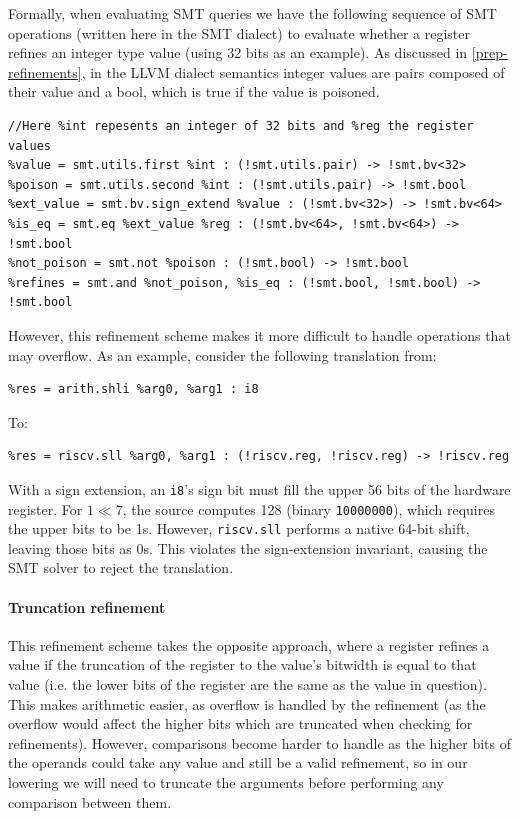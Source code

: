 Formally, when evaluating SMT queries we have the following sequence of SMT operations 
(written here in the SMT dialect) to evaluate whether a register refines an integer type 
value (using 32 bits as an example). As discussed in \ref{prep-refinements}, in the LLVM dialect 
semantics integer values are pairs composed of their value and a bool, which is true if the value 
is poisoned.

\begin{verbatim}
//Here %int repesents an integer of 32 bits and %reg the register values
%value = smt.utils.first %int : (!smt.utils.pair) -> !smt.bv<32>
%poison = smt.utils.second %int : (!smt.utils.pair) -> !smt.bool
%ext_value = smt.bv.sign_extend %value : (!smt.bv<32>) -> !smt.bv<64>
%is_eq = smt.eq %ext_value %reg : (!smt.bv<64>, !smt.bv<64>) -> !smt.bool
%not_poison = smt.not %poison : (!smt.bool) -> !smt.bool
%refines = smt.and %not_poison, %is_eq : (!smt.bool, !smt.bool) -> !smt.bool
\end{verbatim}


However, this refinement scheme makes it more difficult to handle operations that may overflow.
As an example, consider the following translation from:
\begin{verbatim}
%res = arith.shli %arg0, %arg1 : i8 
\end{verbatim}
To:
\begin{verbatim}
%res = riscv.sll %arg0, %arg1 : (!riscv.reg, !riscv.reg) -> !riscv.reg
\end{verbatim}

With a sign extension, an \texttt{i8}'s sign bit must fill the upper 56 bits of the hardware 
register. For $1 \ll 7$, the source computes 128 (binary \texttt{10000000}), which requires the 
upper bits to be 1s. However, \texttt{riscv.sll} performs a native 64-bit shift, 
leaving those bits as 0s. This violates the sign-extension invariant, causing the SMT 
solver to reject the translation.

\paragraph{Truncation refinement}

This refinement scheme takes the opposite approach, where a register refines a value if 
the truncation of the register to the value's bitwidth is equal to that value (i.e. the lower
bits of the register are the same as the value in question). This makes arithmetic
easier, as overflow is handled by the refinement (as the overflow would affect the higher bits
which are truncated when checking for refinements). However, comparisons become harder to handle
as the higher bits of the operands could take any value and still be a valid refinement, so
in our lowering we will need to truncate the arguments before performing any comparison between
them.

